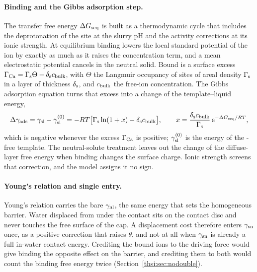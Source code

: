 \paragraph*{Binding and the Gibbs adsorption step.}
The transfer free energy $\Delta G_\mathrm{seq}$ is built as a thermodynamic cycle that includes the deprotonation of the site at the slurry pH and the activity corrections at its ionic strength. %
At equilibrium binding lowers the local standard potential of the ion by exactly as much as it raises the concentration term, and a mean electrostatic potential cancels in the neutral solid. %
Bound  is a surface excess $\Gamma_\mathrm{Ca}=\Gamma_\mathrm{s}\Theta-\delta_\mathrm{s}c_\mathrm{bulk}$, with $\Theta$ the Langmuir occupancy of sites of areal density $\Gamma_\mathrm{s}$ in a layer of thickness $\delta_\mathrm{s}$, and $c_\mathrm{bulk}$ the free-ion concentration. %
The Gibbs adsorption equation turns that excess into a change of the template--liquid energy, %
\begin{equation}\label{eq:gibbs}
\Delta\gamma_\mathrm{ads}=\gamma_\mathrm{sl}-\gamma_\mathrm{sl}^{(0)}=-R T\big[\Gamma_\mathrm{s}\ln(1+x)-\delta_\mathrm{s}c_\mathrm{bulk}\big],\qquad x=\frac{\delta_\mathrm{s}c_\mathrm{bulk}}{\Gamma_\mathrm{s}}\,\mathrm{e}^{-\Delta G_\mathrm{seq}/R T},
\end{equation}
which is negative whenever the excess $\Gamma_\mathrm{Ca}$ is positive; $\gamma_\mathrm{sl}^{(0)}$ is the energy of the -free template. %
The neutral-solute treatment leaves out the change of the diffuse-layer free energy when binding changes the surface charge. %
Ionic strength screens that correction, and the model assigns it no sign. %
\paragraph*{Young's relation and single entry.}
Young's relation carries the bare $\gamma_\mathrm{nl}$, the same energy that sets the homogeneous barrier. %
Water displaced from under the contact sits on the contact disc and never touches the free surface of the cap. %
A displacement cost therefore enters $\gamma_\mathrm{sn}$ once, as a positive correction that raises $\theta$, and not at all when $\gamma_\mathrm{sn}$ is already a full in-water contact energy. %
Crediting the bound ions to the driving force would give binding the opposite effect on the barrier, and crediting them to both would count the binding free energy twice (Section~\ref{thsi:sec:nodouble}). %
